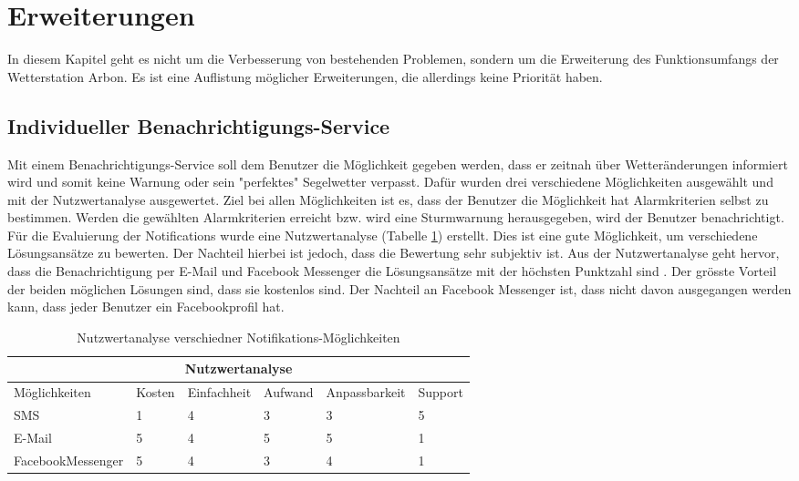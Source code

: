 \section{Erweiterungen}
In diesem Kapitel geht es nicht um die Verbesserung von bestehenden Problemen, sondern um die Erweiterung des Funktionsumfangs der Wetterstation Arbon. Es ist eine Auflistung möglicher Erweiterungen, die allerdings keine Priorität haben.

\subsection{Individueller Benachrichtigungs-Service}
Mit einem Benachrichtigungs-Service soll dem Benutzer die Möglichkeit gegeben werden, dass er zeitnah über Wetteränderungen informiert wird und somit keine Warnung oder sein "perfektes" Segelwetter verpasst. Dafür wurden drei verschiedene Möglichkeiten ausgewählt und mit der Nutzwertanalyse ausgewertet. Ziel bei allen Möglichkeiten ist es, dass der Benutzer die Möglichkeit hat Alarmkriterien selbst zu bestimmen. Werden die gewählten Alarmkriterien erreicht bzw. wird eine Sturmwarnung herausgegeben, wird der Benutzer benachrichtigt. Für die Evaluierung der Notifications wurde eine Nutzwertanalyse (Tabelle \ref{table:nutzwertanalyse}) erstellt. Dies ist eine gute Möglichkeit, um verschiedene Lösungsansätze zu bewerten. Der Nachteil hierbei ist jedoch, dass die Bewertung sehr subjektiv ist. Aus der Nutzwertanalyse geht hervor, dass die Benachrichtigung per E-Mail und Facebook Messenger die Lösungsansätze mit der höchsten Punktzahl sind . Der grösste Vorteil der beiden möglichen Lösungen sind, dass sie kostenlos sind. Der Nachteil an Facebook Messenger ist, dass nicht davon ausgegangen werden kann, dass jeder Benutzer ein Facebookprofil hat. 

\begin{table}
\begin{center}
\begin{tabular}{ |p{3.5cm}||p{1.1cm}|p{2cm}|p{1.7cm}|p{2.3cm}|p{1.4cm}|}
 \hline
 \multicolumn{6}{|c|}{Nutzwertanalyse} \\
 \hline
	Möglichkeiten & Kosten & Einfachheit & Aufwand & Anpassbarkeit & Support\\
 \hline
	SMS & 1 & 4 & 3 & 3 & 5\\
	E-Mail & 5 & 4 & 5 & 5 & 1\\
	FacebookMessenger & 5 & 4 & 3 & 4 & 1\\
 
\hline
\end{tabular}
\end{center}
\caption{Nutzwertanalyse verschiedner Notifikations-Möglichkeiten}
\label{table:nutzwertanalyse}
\end{table}


